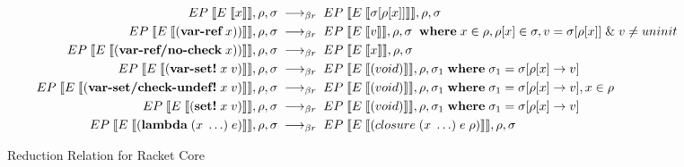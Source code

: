 \documentclass[sigplan,screen,anonymous]{acmart}
\def\dash {\text{-}}
\begin{document}
\begin{figure*}[tbp]
  \begin{align*}
    \rcinput{x} \rcrel \rcoutput{\sigma[\rho[x]]}{\rho}{\sigma} \\
    \rcinput{(\textbf{var\dash ref}\; x))} \rcrel \rcoutput{v}{\rho}{\sigma}\; \where x \in \rho, \rho[x] \in \sigma, v = \sigma[\rho[x]]\; \&\; v \neq uninit\\
    \rcinput{(\textbf{var\dash ref/no\dash check}\; x))} \rcrel \rcoutput{x}{\rho}{\sigma} \\
    \rcinput{(\textbf{var\dash set!}\; x\; v)} \rcrel \rcoutput{(void)}{\rho}{\sigma_1} \where \sigma_1 = \sigma[\rho[x]\rightarrow v]\\
    \rcinput{(\textbf{var\dash set/check\dash undef!}\; x\; v)} \rcrel \rcoutput{(void)}{\rho}{\sigma_1} \where \sigma_1 = \sigma[\rho[x]\rightarrow v], x \in \rho\\
    \rcinput{(\textbf{set!}\; x\; v)} \rcrel \rcoutput{(void)}{\rho}{\sigma_1} \where \sigma_1 = \sigma[\rho[x]\rightarrow v]\\
    \rcinput{(\textbf{lambda}\; (x\; \ldots)\; e)} \rcrel \rcoutput{(closure\; (x\; \ldots)\; e\; \rho)}{\rho}{\sigma} \\
  \end{align*}
  \caption{Reduction Relation for Racket Core}
  \label{fig:rc-reduction}
\end{figure*}
\end{document}
